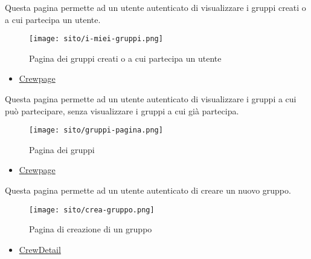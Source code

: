 \label{par:Gruppi dell'utente}
Questa pagina permette ad un utente autenticato di visualizzare i gruppi creati
o a cui partecipa un utente.
\begin{figure}[H]
    \centering
    \texttt{[image: sito/i-miei-gruppi.png]}
    \caption{Pagina dei gruppi creati o a cui partecipa un utente}
\end{figure}
\begin{itemize}
    \item \hyperref[par:Crewpage]{Crewpage}
\end{itemize}

\label{par:Gruppi}
Questa pagina permette ad un utente autenticato di visualizzare i gruppi a cui
può partecipare, senza visualizzare i gruppi a cui già partecipa.
\begin{figure}[H]
    \centering
    \texttt{[image: sito/gruppi-pagina.png]}
    \caption{Pagina dei gruppi}
\end{figure}
\begin{itemize}
    \item \hyperref[par:Crewpage]{Crewpage}
\end{itemize}

\label{par:Crea nuovo gruppo}

Questa pagina permette ad un utente autenticato di creare un nuovo gruppo.
\begin{figure}[H]
    \centerline{\texttt{[image: sito/crea-gruppo.png]}}
    \caption{Pagina di creazione di un gruppo}
\end{figure}
\begin{itemize}
    \item \hyperref[par:CrewDetail]{CrewDetail}
\end{itemize}

